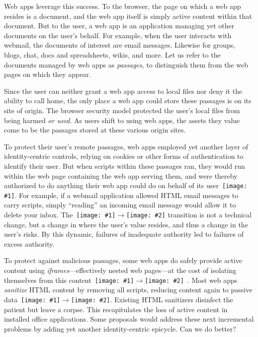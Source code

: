 \documentclass[letterpaper,twocolumn,10pt]{article}
\newcommand{\q}[1]{{\texttt{[image: \#1]}}}
\newcommand{\qq}[2]{{\texttt{[image: \#1]}}$\rightarrow${\texttt{[image: \#2]}}}
\begin{document}
Web apps leverage this success. To the browser, the page on which a web app 
resides is a document, and the web app itself is simply active content within 
that document. But to the user, a web app is an application managing yet 
other documents on the user's behalf. For example, when the user interacts 
with webmail, the documents of interest are email messages. Likewise for 
groups, blogs, chat, docs and spreadsheets, wikis, and more. Let us refer to 
the documents managed by web apps as \emph{passages}, to distinguish them 
from the web pages on which they appear.

Since the user can neither grant a web app access to local files nor deny it 
the ability to call home, the only place a web app could store these passages 
is on its site of origin. The browser security model protected the user's 
local files from being harmed \emph{or used}. As users shift to using web 
apps, the assets they value come to be the passages stored at these various 
origin sites. 

To protect their user's remote passages, web apps employed yet another layer 
of identity-centric controls, relying on cookies or other forms of 
authentication to identify their user. But when scripts within these passages 
ran, they would run within the web page containing the web app serving them, 
and were thereby authorized to do anything their web app could do on behalf 
of its user~\q{4}. For example, if a webmail application allowed HTML email 
messages to carry scripts, simply ``reading'' an incoming email message would 
allow it to delete your inbox. The~\qq{3}{4} transition is not a technical 
change, but a change in where the user's value resides, and thus a change in 
the user's risks. By this dynamic, failures of inadequate authority led to 
failures of excess authority.

To protect against malicious passages, some web apps do safely provide active 
content using \emph{iframes}---effectively nested web pages---at the cost of 
isolating themselves from this content~\qq{4}{3}~\cite{mashupos}. Most web 
apps \emph{sanitize} HTML content by removing all scripts, reducing content 
again to passive data~\qq{4}{1}. Existing HTML sanitizers disinfect the 
patient but leave a corpse. This recapitulates the loss of active content in 
installed office applications. Some proposals would address these next 
incremental problems by adding yet another identity-centric 
epicycle. Can we do better?
\end{document}
